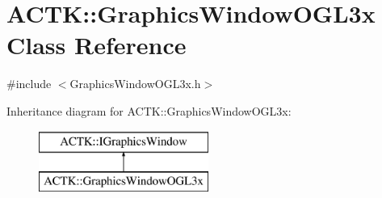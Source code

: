 \hypertarget{class_a_c_t_k_1_1_graphics_window_o_g_l3x}{\section{A\-C\-T\-K\-:\-:Graphics\-Window\-O\-G\-L3x Class Reference}
\label{class_a_c_t_k_1_1_graphics_window_o_g_l3x}
}


{\ttfamily \#include $<$Graphics\-Window\-O\-G\-L3x.\-h$>$}

Inheritance diagram for A\-C\-T\-K\-:\-:Graphics\-Window\-O\-G\-L3x\-:\begin{figure}[H]
\begin{center}
\leavevmode
\includegraphics[height=2.000000cm]{class_a_c_t_k_1_1_graphics_window_o_g_l3x}
\end{center}
\end{figure}
